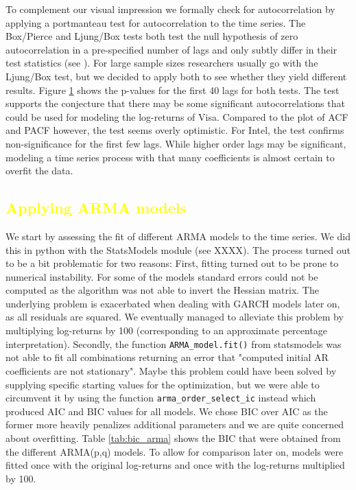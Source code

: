 To complement our visual impression we formally check for autocorrelation by applying a portmanteau test for autocorrelation to the time series. The Box/Pierce and Ljung/Box tests both test the null hypothesis of zero autocorrelation in a pre-specified number of lags and only subtly differ in their test statistics (see \citep{ljung_measure_1978}). For large sample sizes researchers usually go with the Ljung/Box test, but we decided to apply both to see whether they yield different results. Figure \ref{fig:ljungbox} shows the p-values for the first 40 lags for both tests. The test supports the conjecture that there may be some significant autocorrelations that could be used for modeling the log-returns of Visa. Compared to the plot of ACF and PACF however, the test seems overly optimistic. For Intel, the test confirms non-significance for the first few lags. While higher order lags may be significant, modeling a time series process with that many coefficients is almost certain to overfit the data. 

\begin{figure}[h!]
    \centering
    \begin{adjustbox}{width=.95\textwidth,center}
    
    
    \end{adjustbox}
    \caption{}
    \label{fig:ljungbox}
\end{figure}{}

\subsection{\textcolor{yellow}{Applying ARMA models}}
We start by assessing the fit of different ARMA models to the time series. We did this in python with the StatsModels module (see XXXX). The process turned out to be a bit problematic for two reasons: First, fitting turned out to be prone to numerical instability. For some of the models standard errors could not be computed as the algorithm was not able to invert the Hessian matrix. The underlying problem is exacerbated when dealing with GARCH models later on, as all residuals are squared. We eventually managed to alleviate this problem by multiplying log-returns by 100 (corresponding to an approximate percentage interpretation). Secondly, the function \texttt{ARMA\_model.fit()} from statsmodels was not able to fit all combinations returning an error that "computed initial AR coefficients are not stationary". Maybe this problem could have been solved by supplying specific starting values for the optimization, but we were able to circumvent it by using the function \texttt{arma\_order\_select\_ic} instead which produced AIC and BIC values for all models. We chose BIC over AIC as the former more heavily penalizes additional parameters and we are quite concerned about overfitting. Table \ref{tab:bic_arma} shows the BIC that were obtained from the different ARMA(p,q) models. To allow for comparison later on, models were fitted once with the original log-returns and once with the log-returns multiplied by 100. 


